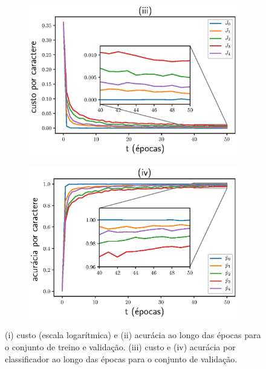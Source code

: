 \begin{figure}[ht]
\begin{center}
\begin{subfigure}{.5\textwidth}
			\centering
			\includegraphics[width=0.95\linewidth]{figuras/C5o6C5o12C5o36C5o36Rfl100MchD_lossi.eps}
		\end{subfigure}\hfill%
		\begin{subfigure}{.5\textwidth}
			\centering
			\includegraphics[width=0.95\linewidth]{figuras/C5o6C5o12C5o36C5o36Rfl100MchD_acci.eps}
		\end{subfigure}\hfill%
		\newline
	\end{center}
	\small (i) custo (escala logarítmica) e (ii) acurácia ao longo das épocas para o conjunto de treino e validação. (iii) custo e (iv) acurácia por classificador ao longo das épocas para o conjunto de validação.  
\end{figure}
 


